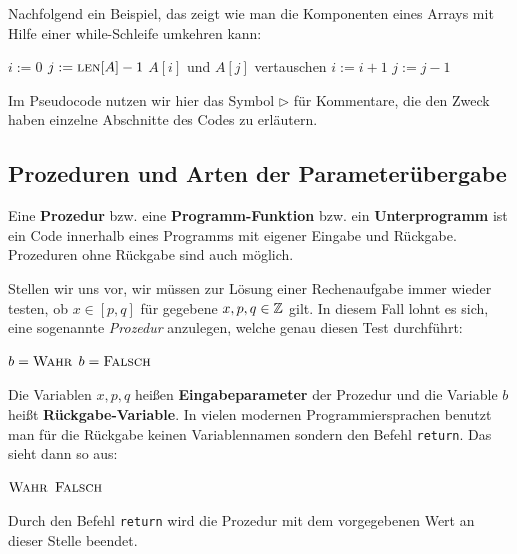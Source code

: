 \begin{bsp} 
Nachfolgend ein Beispiel, das zeigt wie man die Komponenten eines Arrays mit Hilfe einer while-Schleife umkehren kann:
\begin{center}
	\begin{algorithmic}[1]
		\STATE $i:=0$
		\STATE $j:=\mathop{\text{\textsc{len}}}[A]-1$
		\STATE $A[i]$ und $A[j]$ vertauschen 
		\STATE $i:=i+1$ 
		\STATE $j:=j-1$ 
		\ENDWHILE
	\end{algorithmic}
\end{center}
\end{bsp} 

\begin{bem} 
Im Pseudocode nutzen wir hier das Symbol $\triangleright$ für Kommentare, die den Zweck haben einzelne Abschnitte des Codes zu erläutern.
\end{bem} 


\subsection{Prozeduren und Arten der Parameterübergabe}
\label{sect:prozeduren}

\begin{defn}
Eine \textbf{Prozedur} bzw. eine \textbf{Programm-Funktion} bzw. ein \textbf{Unterprogramm} ist ein Code innerhalb eines Programms mit eigener Eingabe und Rückgabe. Prozeduren ohne Rückgabe sind auch möglich. 
\end{defn} 

\begin{bem} 
Stellen wir uns vor, wir müssen zur Lösung einer Rechenaufgabe immer wieder testen, ob $ x \in [p,q]$ für gegebene $x,p,q \in \mathbb{Z}$ gilt. In diesem Fall lohnt es sich, eine sogenannte \emph{Prozedur} anzulegen, welche genau diesen Test durchführt:

\begin{algorithm}[H]
	\caption{$b=\cc{Ist-zwischen}(x,p,q)$}
	\begin{algorithmic}
		\STATE $b=\mathop{\text{\textsc{Wahr}}}$
		\ELSE
		\STATE $b=\mathop{\text{\textsc{Falsch}}}$
		\ENDIF
	\end{algorithmic}
\end{algorithm}

Die Variablen $x,p,q$ heißen \textbf{Eingabeparameter} der Prozedur und die Variable $b$ heißt \textbf{Rückgabe-Variable}. In vielen modernen Programmiersprachen benutzt man für die Rückgabe keinen Variablennamen sondern den Befehl \texttt{return}. Das sieht dann so aus: 

\begin{algorithm}[H]
	\caption{$\cc{Ist-zwischen}(x,p,q)$}
	\begin{algorithmic}
		\IF{$p \le x \le q$ oder $q \le x \le p$}
		\RETURN $\mathop{\text{\textsc{Wahr}}}$
		\ENDIF
		\RETURN $\mathop{\text{\textsc{Falsch}}}$
	\end{algorithmic}
\end{algorithm}
Durch den Befehl \texttt{return} wird die Prozedur mit dem vorgegebenen Wert an dieser Stelle beendet.
\end{bem} 


